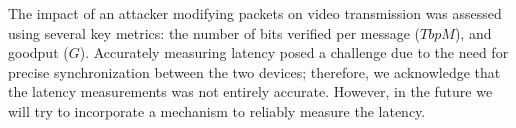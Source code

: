 The impact of an attacker modifying packets on video transmission was assessed using several key metrics: the number of bits verified per message ($TbpM$), and goodput ($G$). Accurately measuring latency posed a challenge due to the need for precise synchronization between the two devices; therefore, we acknowledge that the latency measurements was not entirely accurate. However, in the future we will try to incorporate a mechanism to reliably measure the latency.





